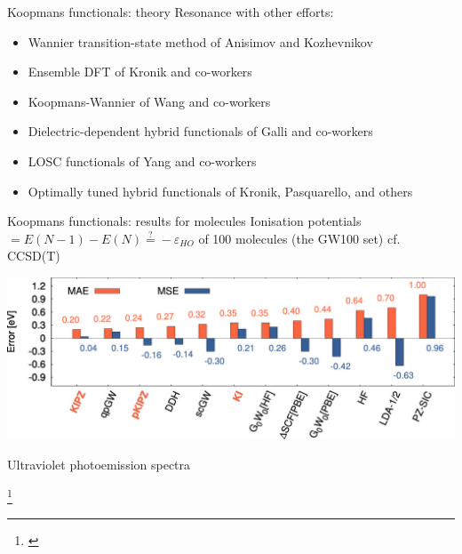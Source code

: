 \documentclass[xcolor=table,aspectratio=169]{beamer}
\newcommand\blfootcite[1]{%
  \begingroup
  \renewcommand\thefootnote{}\footnote{\hspace{-4ex}\cite{#1}}%
  \addtocounter{footnote}{-1}%
  \endgroup
}
\numberwithin{equation}{section}
\begin{document}
\begin{frame}{Koopmans functionals: theory}
   Resonance with other efforts:
   \begin{itemize}
      \item Wannier transition-state method of Anisimov and Kozhevnikov \cite{Anisimov2005}
      \item Ensemble DFT of Kronik and co-workers \cite{Kraisler2013}
      \item Koopmans-Wannier of Wang and co-workers \cite{Ma2016}
      \item Dielectric-dependent hybrid functionals of Galli and co-workers \cite{Skone2016a}
      \item LOSC functionals of Yang and co-workers \cite{Li2018}
      \item Optimally tuned hybrid functionals of Kronik, Pasquarello, and others \cite{Wing2021}
   \end{itemize}
\end{frame}

\begin{frame}{Koopmans functionals: results for molecules}
   \small
   Ionisation potentials $ = E(N-1) - E(N) \stackrel{?}{=} -\varepsilon_{HO}$ of 100 molecules (the GW100 set) cf. CCSD(T)
   \begin{center}
      \includegraphics[height=0.2\textwidth]{figures/colonna_2019_gw100_ip}
   \end{center}

   \vspace{-3ex}
   Ultraviolet photoemission spectra
   \begin{center}
   \end{center}
   \vspace{-2ex}

   \blfootcite{Colonna2018,Nguyen2015}
\end{frame}
\end{document}
